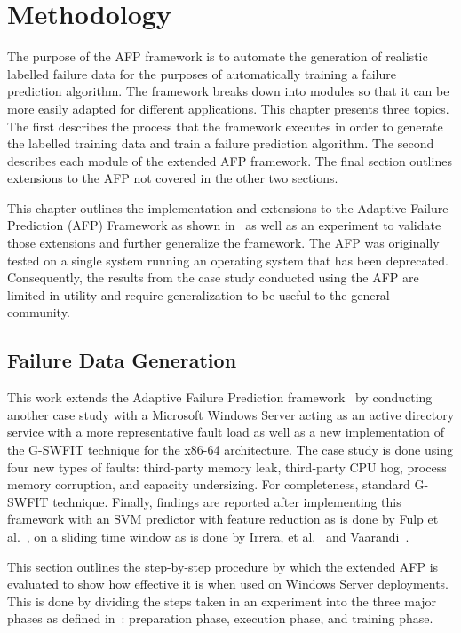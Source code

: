 \chapter{Methodology} \label{chapter3}
The purpose of the AFP framework is to automate the generation of realistic
labelled failure data for the purposes of automatically training a failure
prediction algorithm.  The framework breaks down into modules so that it can be
more easily adapted for different applications.  This chapter presents three
topics.  The first describes the process that the framework executes in order
to generate the labelled training data and train a failure prediction
algorithm.  The second describes each module of the extended AFP framework.
The final section outlines extensions to the AFP not covered in the other two
sections.

This chapter outlines the implementation and extensions to the Adaptive Failure
Prediction (AFP) Framework as shown in~\cite{irrera2015} as well as an
experiment to validate those extensions and further generalize the framework.
The AFP was originally tested on a single system running an operating system
that has been deprecated.  Consequently, the results from the case study
conducted using the AFP are limited in utility and require generalization to be
useful to the general community.

\section{Failure Data Generation} \label{sec:generation}
This work extends the Adaptive Failure Prediction framework~\cite{irrera2015}
by conducting another case study with a Microsoft Windows Server acting as an
active directory service with a more representative fault load as well as a new
implementation of the G-SWFIT technique for the x86-64 architecture.  The case
study is done using four new types of faults: third-party memory leak,
third-party CPU hog, process memory corruption, and capacity undersizing.  For
completeness, standard G-SWFIT technique.  Finally, findings are reported after
implementing this framework with an SVM predictor with feature reduction as is
done by Fulp et al.~\cite{fulp2008}, on a sliding time window as is done by
Irrera, et al.~\cite{irrera2013a} and Vaarandi~\cite{vaarandi2002}.

This section outlines the step-by-step procedure by which the extended AFP is
evaluated to show how effective it is when used on Windows Server deployments.
This is done by dividing the steps taken in an experiment into the three major
phases as defined in~\cite{irrera2015}: preparation phase, execution phase, and
training phase.

